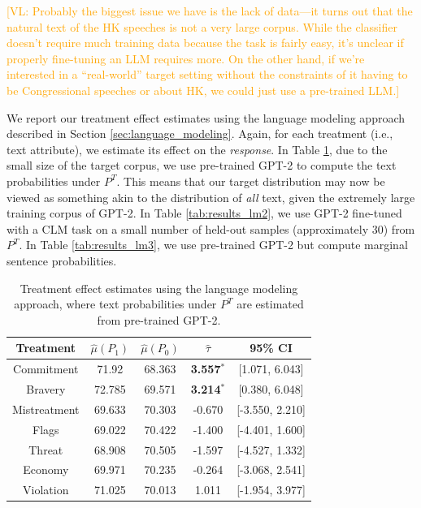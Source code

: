 \documentclass{article}
\newcommand{\vl}[1]{\textcolor{orange}{[VL: #1]}}
\begin{document}
\vl{Probably the biggest issue we have is the lack of data---it turns out that the natural text of the HK speeches is not a very large corpus. While the classifier doesn't require much training data because the task is fairly easy, it's unclear if properly fine-tuning an LLM requires more.
\newline
\newline
On the other hand, if we're interested in a ``real-world'' target setting without the constraints of it having to be Congressional speeches or about HK, we could just use a pre-trained LLM.}

We report our treatment effect estimates using the language modeling approach described in Section \ref{sec:language_modeling}. Again, for each treatment (i.e., text attribute), we estimate its effect on the \textit{response}. In Table \ref{tab:results_lm1}, due to the small size of the target corpus, we use pre-trained GPT-2 to compute the text probabilities under $P^T$. This means that our target distribution may now be viewed as something akin to the distribution of \textit{all} text, given the extremely large training corpus of GPT-2. In Table \ref{tab:results_lm2}, we use GPT-2 fine-tuned with a CLM task on a small number of held-out samples (approximately 30) from $P^T$. In Table \ref{tab:results_lm3}, we use pre-trained GPT-2 but compute marginal sentence probabilities.

\begin{table}[!ht]
    \centering
    \begin{tabular}{c|cccc}
        \toprule
        Treatment & $\hat{\mu}(P_1)$ & $\hat{\mu}(P_0)$ & $\hat{\tau}$ & 95\% CI \\
        \midrule
        Commitment & 71.92 & 68.363 & \textbf{\textcolor{green!50!black}{3.557$^*$}} & [1.071, 6.043] \\
        Bravery & 72.785 & 69.571 & \textbf{\textcolor{green!50!black}{3.214$^*$}} & [0.380, 6.048]  \\
        Mistreatment & 69.633 & 70.303 & \textcolor{red!80!black}{-0.670} & [-3.550, 2.210] \\
        Flags & 69.022 & 70.422 & \textcolor{red!80!black}{-1.400} & [-4.401, 1.600] \\
        Threat & 68.908 & 70.505 & \textcolor{red!80!black}{-1.597} & [-4.527, 1.332] \\
        Economy & 69.971 & 70.235 & \textcolor{red!80!black}{-0.264} & [-3.068, 2.541] \\
        Violation & 71.025 & 70.013 & \textcolor{green!50!black}{1.011} & [-1.954, 3.977] \\
        \bottomrule
    \end{tabular}
    \caption{Treatment effect estimates using the language modeling approach, where text probabilities under $P^T$ are estimated from pre-trained GPT-2.}
    \label{tab:results_lm1}
\end{table}
\end{document}
